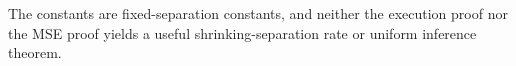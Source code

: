 The constants are fixed-separation constants, and neither the execution proof nor the MSE proof yields a useful shrinking-separation rate or uniform inference theorem.